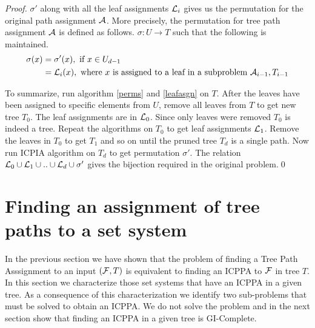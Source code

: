 \documentclass{llncs}
\def\cA{{\cal A}}
\def\cF{{\cal F}}
\def\cL{{\cal L}}
\begin{document}
\begin{proof}
\noindent
$\sigma'$ along with all the leaf assignments $\cL_i$
gives us the permutation for the original path assignment $\cA$.
More precisely, the permutation for tree path assignment $\cA$ is defined as
follows. $\sigma: U \rightarrow T$ such that the following
is maintained.
\begin{align*}
 \sigma(x) &= \sigma'(x),   \text{ if } x \in U_{d-1} \\
           &= \cL_i(x),     \text{ where $x$ is assigned to a leaf in a
             subproblem $\cA_{i-1}, T_{i-1}$}
\end{align*}

\noindent
To summarize, run algorithm \ref{perms} and
\ref{leafasgn} on $T$. After the leaves have been assigned to specific
elements from $U$, remove all leaves from $T$ to get new tree
$T_0$. The leaf assignments are in $\cL_0$. Since only leaves were removed $T_0$ is indeed a tree. Repeat
the algorithms on $T_0$ to get leaf assignments $\cL_{1}$. Remove the
leaves in $T_0$ to get $T_1$ and so on until the pruned tree $T_d$
is a single path. Now run ICPIA algorithm on $T_d$ to get
permutation $\sigma'$. The relation $\cL_0 \cup \cL_1 \cup .. \cup
\cL_{d} \cup \sigma'$ gives the bijection required in the original problem.\qed
\end{proof}

\section{Finding an assignment of tree paths to a set
  system} \label{decompos} In the previous section we have shown that
the problem of finding a Tree Path Asssignment to an input $(\cF,T)$
is equivalent to finding an ICPPA to $\cF$ in tree $T$.  In this
section we characterize those set systems that have an ICPPA in a
given tree.  As a consequence of this characterization we identify two
sub-problems that must be solved to obtain an ICPPA.  We do not solve
the problem and in the next section show that finding an ICPPA in a
given tree is GI-Complete.
\end{document}
